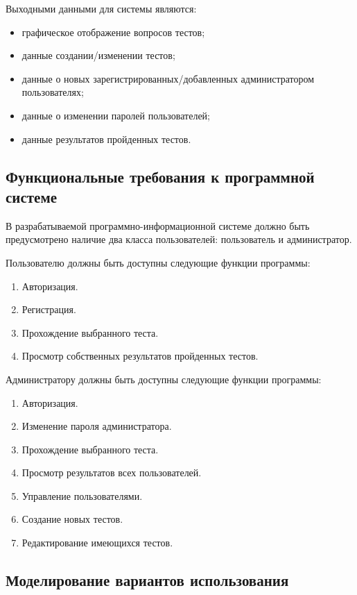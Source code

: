 Выходными данными для системы являются:
\begin{itemize}
	\item графическое отображение вопросов тестов;
	\item данные создании/изменении тестов;
	\item данные о новых зарегистрированных/добавленных администратором пользователях;
	\item данные о изменении паролей пользователей;
	\item данные результатов пройденных тестов.
\end{itemize}

\subsection{Функциональные требования к программной системе}

В разрабатываемой программно-информационной системе должно
быть предусмотрено наличие два класса пользователей: пользователь и администратор.

Пользователю должны быть доступны следующие функции программы:
\begin{enumerate}
	\item Авторизация.
	\item Регистрация.
	\item Прохождение выбранного теста.
	\item Просмотр собственных результатов пройденных тестов.
\end{enumerate}

Администратору должны быть доступны следующие функции программы:
\begin{enumerate}
	\item Авторизация.
	\item Изменение пароля администратора.
	\item Прохождение выбранного теста.
	\item Просмотр результатов всех пользователей.
	\item Управление пользователями.
	\item Создание новых тестов.
	\item Редактирование имеющихся тестов.
\end{enumerate}

\subsection{Моделирование вариантов использования}

